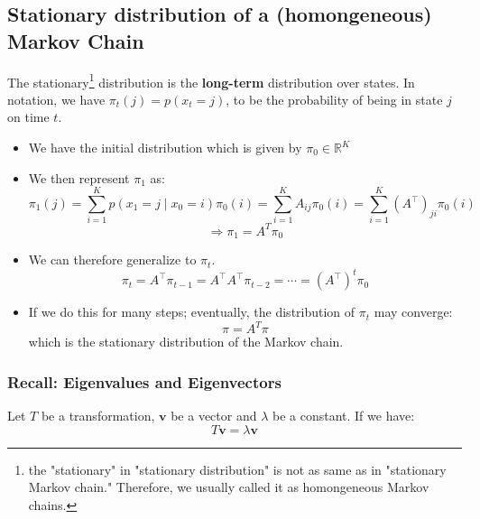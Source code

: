 \subsection{Stationary distribution of a (homongeneous) Markov Chain}
The stationary\footnote{the "stationary" in "stationary distribution" is not as same as in "stationary Markov chain." Therefore, we usually called it as homongeneous Markov chains.} distribution is the \textbf{long-term} distribution over states. In notation, we have $\pi_t(j)=p(x_t=j)$, to be the probability of being in state $j$ on time $t$.\\
\begin{itemize}
    \item We have the initial distribution which is given by $\pi_0\in\mathbb{R}^{K}$
    \item We then represent $\pi_1$ as:
    $$\pi_1(j)=\sum_{i=1}^K p\left(x_1=j \mid x_0=i\right) \pi_0(i)=\sum_{i=1}^K A_{i j} \pi_0(i)=\sum_{i=1}^K\left(A^{\top}\right)_{j i} \pi_0(i)$$
    $$\Rightarrow \pi_1=A^T\pi_0$$
    \item We can therefore generalize to $\pi_t$.
    $$\pi_t=A^{\top} \pi_{t-1}=A^{\top} A^{\top} \pi_{t-2}=\cdots=\left(A^{\top}\right)^t \pi_0$$
    \item If we do this for many steps; eventually, the distribution of $\pi_t$ may converge:
    $$\pi=A^T\pi$$
    which is the stationary distribution of the Markov chain.
\end{itemize}

\subsubsection*{Recall: Eigenvalues and Eigenvectors}
Let $T$ be a transformation, $\mathbf{v}$ be a vector and $\lambda$ be a constant. If we have:
$$T\mathbf{v}=\lambda\mathbf{v}$$